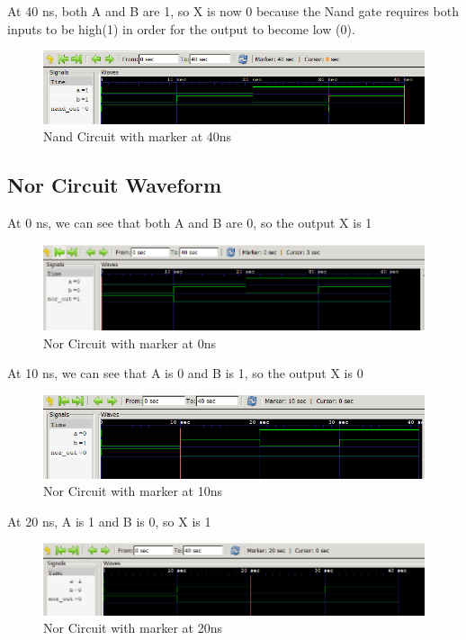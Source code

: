 \documentclass[12pt]{article}
\begin{document}
At 40 ns, both A and B are 1, so X is now 0 because the Nand gate requires both inputs to be  high(1) in order for the output to become low (0).
\begin{figure}[h]
    \centering
    \includegraphics[width = 1.0\textwidth]{figs/Nand40.png}
    \caption{Nand Circuit with marker at 40ns}
    \label{fig:enter-label}
\end{figure}

\newpage

\subsection{Nor Circuit Waveform}

At 0 ns, we can see that both A and B are 0, so the output X is 1
\begin{figure}[h]
    \centering
    \includegraphics[width = 1.0\textwidth]{figs/Nor0.png}
    \caption{Nor Circuit with marker at 0ns}
    \label{fig:enter-label}
\end{figure}


At 10 ns, we can see that A is 0 and B is 1, so the output X is 0
\begin{figure}[h]
    \centering
    \includegraphics[width = 1.0\textwidth]{figs/Nor10.png}
    \caption{Nor Circuit with marker at 10ns}
    \label{fig:enter-label}
\end{figure}

At 20 ns, A is 1 and B is 0, so X is 1
\begin{figure}[h]
    \centering
    \includegraphics[width = 1.0\textwidth]{figs/Nor20.png}
    \caption{Nor Circuit with marker at 20ns}
    \label{fig:enter-label}
\end{figure}
\end{document}
